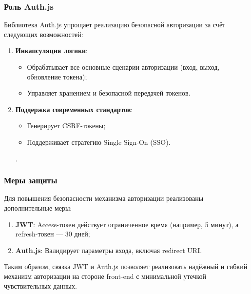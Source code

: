 \subsubsection{Роль Auth.js}
Библиотека Auth.js упрощает реализацию безопасной авторизации за счёт следующих возможностей:
\begin{enumerate}
  \item \textbf{Инкапсуляция логики}:
    \begin{itemize}
      \item Обрабатывает все основные сценарии авторизации (вход, выход, обновление токена);
      \item Управляет хранением и безопасной передачей токенов.
    \end{itemize}
  \item \textbf{Поддержка современных стандартов}:
    \begin{itemize}
      \item Генерирует CSRF-токены;
      \item Поддерживает стратегию Single Sign-On (SSO).
    \end{itemize}.
\end{enumerate}

\subsubsection{Меры защиты}
Для повышения безопасности механизма авторизации реализованы дополнительные меры:

\begin{enumerate}
  \item \textbf{JWT}: Access-токен действует ограниченное время (например, 5 минут), а refresh-токен — 30 дней;
  \item \textbf{Auth.js}: Валидирует параметры входа, включая redirect URI.
\end{enumerate}

Таким образом, связка JWT и Auth.js позволяет реализовать надёжный и гибкий механизм авторизации на стороне front-end с минимальной утечкой чувствительных данных.